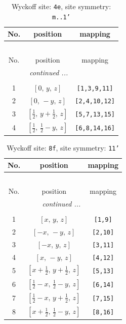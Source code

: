 \documentclass[fleqn,8pt]{jsarticle}
\begin{document}
\renewcommand{\arraystretch}{1.2}
\begin{longtable}{ccc}
\caption{Wyckoff site: {\tt 4e}, site symmetry: {\tt m..1'}}
 \\
 \hline \hline
No. & position & mapping \\ \hline \endfirsthead

\multicolumn{2}{l}{\tablename\ \thetable{}} \\
 \hline \hline
No. & position & mapping \\ \hline \endhead

 \hline \hline
\multicolumn{2}{r}{\footnotesize\it continued ...} \\ \endfoot

 \hline \hline
\multicolumn{2}{r}{} \\ \endlastfoot

1 & $\left[ 0,\, y,\, z \right]$ & {\tt [1,3,9,11]} \\ \hline
2 & $\left[ 0,\, - y,\, z \right]$ & {\tt [2,4,10,12]} \\ \hline
3 & $\left[ \frac{1}{2},\, y + \frac{1}{2},\, z \right]$ & {\tt [5,7,13,15]} \\ \hline
4 & $\left[ \frac{1}{2},\, \frac{1}{2} - y,\, z \right]$ & {\tt [6,8,14,16]} \\
\end{longtable}
\renewcommand{\arraystretch}{1.2}
\begin{longtable}{ccc}
\caption{Wyckoff site: {\tt 8f}, site symmetry: {\tt 11'}}
 \\
 \hline \hline
No. & position & mapping \\ \hline \endfirsthead

\multicolumn{2}{l}{\tablename\ \thetable{}} \\
 \hline \hline
No. & position & mapping \\ \hline \endhead

 \hline \hline
\multicolumn{2}{r}{\footnotesize\it continued ...} \\ \endfoot

 \hline \hline
\multicolumn{2}{r}{} \\ \endlastfoot

1 & $\left[ x,\, y,\, z \right]$ & {\tt [1,9]} \\ \hline
2 & $\left[ - x,\, - y,\, z \right]$ & {\tt [2,10]} \\ \hline
3 & $\left[ - x,\, y,\, z \right]$ & {\tt [3,11]} \\ \hline
4 & $\left[ x,\, - y,\, z \right]$ & {\tt [4,12]} \\ \hline
5 & $\left[ x + \frac{1}{2},\, y + \frac{1}{2},\, z \right]$ & {\tt [5,13]} \\ \hline
6 & $\left[ \frac{1}{2} - x,\, \frac{1}{2} - y,\, z \right]$ & {\tt [6,14]} \\ \hline
7 & $\left[ \frac{1}{2} - x,\, y + \frac{1}{2},\, z \right]$ & {\tt [7,15]} \\ \hline
8 & $\left[ x + \frac{1}{2},\, \frac{1}{2} - y,\, z \right]$ & {\tt [8,16]} \\
\end{longtable}
\end{document}
